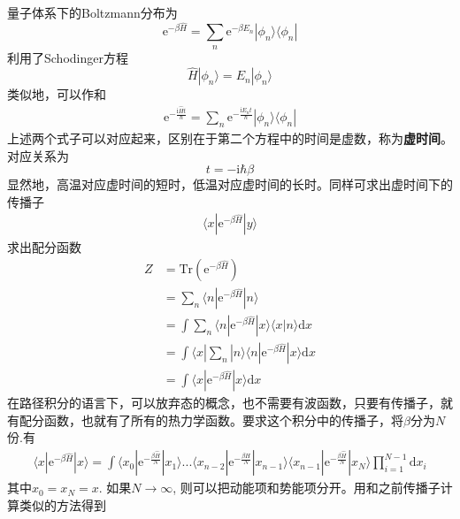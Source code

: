 \documentclass[12pt]{article}
\begin{document}
    量子体系下的Boltzmann分布为
    \begin{equation*}
        \mathrm{e}^{-\beta \hat{H}} = \sum_n \mathrm{e}^{-\beta E_n} |\phi_n \rangle \langle \phi_n|
    \end{equation*}
    利用了Schodinger方程
    \begin{equation*}
        \hat{H} |\phi_n \rangle = E_n |\phi_n \rangle
    \end{equation*}
    类似地，可以作和
    \begin{align*}
        \mathrm{e}^{-\frac {\mathrm{i}\hat{H}t}{\hbar}} = \sum_n \mathrm{e}^{-\frac {\mathrm{i}E_n t}{\hbar}} |\phi_n \rangle \langle \phi_n|
    \end{align*}
    上述两个式子可以对应起来，区别在于第二个方程中的时间是虚数，称为\textbf{虚时间}。对应关系为
    \begin{equation*}
        t = -\mathrm{i}\hbar \beta
    \end{equation*}
    显然地，高温对应虚时间的短时，低温对应虚时间的长时。同样可求出虚时间下的传播子
    \begin{align*}
        \langle x|\mathrm{e}^{-\beta \hat{H}}|y\rangle
    \end{align*}
    求出配分函数
    \begin{align*}
        Z &= \mathrm{Tr}(\mathrm{e}^{-\beta \hat{H}}) \\
        &= \sum_n \langle n| \mathrm{e}^{-\beta \hat{H}}|n\rangle \\
        &= \int \sum_n \langle n| \mathrm{e}^{-\beta \hat{H}}|x \rangle \langle x|n\rangle \mathrm{d}x\\
        &= \int \langle x|\sum_n|n \rangle \langle n| \mathrm{e}^{-\beta \hat{H}}|x\rangle \mathrm{d}x\\
        &= \int \langle x|\mathrm{e}^{-\beta \hat{H}}|x\rangle \mathrm{d}x
    \end{align*}
    在路径积分的语言下，可以放弃态的概念，也不需要有波函数，只要有传播子，就有配分函数，也就有了所有的热力学函数。要求这个积分中的传播子，将$\beta$分为$N$份.有
    \begin{align*}
        \langle x|\mathrm{e}^{-\beta \hat{H}}|x\rangle  = \int \langle x_0|\mathrm{e}^{-\frac {\beta \hat{H}}N} |x_1 \rangle ... \langle x_{n-2}|\mathrm{e}^{-\frac {\beta \hat{H}}N} |x_{n-1} \rangle \langle x_{n-1}|\mathrm{e}^{-\frac {\beta \hat{H}}N} |x_N \rangle \prod_{i=1}^{N-1}\mathrm{d}x_i
    \end{align*}
    其中$x_0=x_N = x$. 如果$N \to \infty$, 则可以把动能项和势能项分开。用和之前传播子计算类似的方法得到
\end{document}
